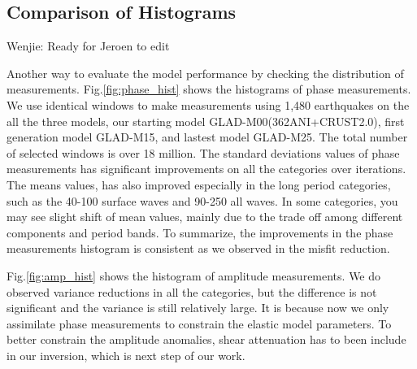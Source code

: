 \documentclass[extra,mreferee]{gji}
\begin{document}
\subsection{Comparison of Histograms}

{\color{Red} Wenjie: Ready for Jeroen to edit}

Another way to evaluate the model performance by checking the distribution
of measurements. Fig.\ref{fig:phase_hist} shows the histograms of phase
measurements. We use identical windows to make measurements using 1,480
earthquakes on the all the three models, our starting model
GLAD-M00(362ANI+CRUST2.0), first generation model GLAD-M15,
and lastest model GLAD-M25. The total number of selected windows is over
18 million. The standard deviations values of phase measurements has
significant improvements on all the categories over iterations.
The means values, has also improved especially in the long period categories,
such as the 40-100 surface waves and 90-250 all waves. In some categories,
you may see slight shift of mean values, mainly due to the trade off among
different components and period bands. To summarize, the improvements in
the phase measurements histogram is consistent as we observed in the
misfit reduction.

Fig.\ref{fig:amp_hist} shows the histogram of amplitude measurements. We do
observed variance reductions in all the categories, but the difference is
not significant and the variance is still relatively large.
It is because now we only assimilate phase measurements to
constrain the elastic model parameters. To better constrain the amplitude
anomalies, shear attenuation has to been include in our inversion, which is
next step of our work.
\end{document}
